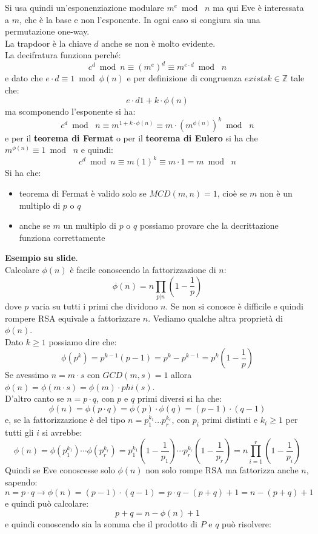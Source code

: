 \documentclass[a4paper,12pt, oneside]{book}
\begin{document}
Si usa quindi un'esponenziazione modulare $m^e\bmod\,\,n$ ma qui Eve è
interessata a $m$, che è la base e non l'esponente. In ogni caso si congiura sia
una permutazione one-way.\\
La trapdoor è la chiave $d$ anche se non è molto evidente.\\
La decifratura funziona perché:
\[c^d\bmod n\equiv (m^e)^d\equiv m^{e\cdot d}\bmod\,\,n\]
e dato che $e\cdot d\equiv 1\bmod\phi(n)$ e per definizione di congruenza
$exists k\in\mathbb{Z}$ tale che:
\[e\cdot d1+k\cdot\phi(n)\]
ma scomponendo l'esponente si ha:
\[c^d\bmod\,\,n\equiv m^{1+k\cdot\phi(n)}\equiv m\cdot (m^{\phi(n)})^k\bmod \,\,n\]
e per il \textbf{teorema di Fermat} o per il \textbf{teorema di Eulero} si ha
che $m^{\phi(n)}\equiv 1\bmod \,\,n$ e quindi:
\[c^d\bmod n\equiv m(1)^k\equiv m\cdot 1 = m\bmod \,\,n\]
Si ha che:
\begin{itemize}
  \item teorema di Fermat è valido solo se $MCD (m, n) = 1$, cioè se $m$ non è
  un   multiplo di $p$ o $q$ 
  \item anche se $m$ un multiplo di $p$ o $q$  possiamo provare
  che la decrittazione funziona correttamente 
\end{itemize}
\textbf{Esempio su slide}.\\
Calcolare $\phi(n)$ è facile conoscendo la fattorizzazione di $n$:
\[\phi(n)=n\prod_{p|n}\left(1-\frac{1}{p}\right)\]
dove $p$ varia su tutti i primi che dividono $n$. Se non si conosce è difficile
e quindi rompere RSA equivale a  fattorizzare $n$.
Vediamo qualche altra proprietà di $\phi(n)$. \\
Dato $k\geq 1$ possiamo dire che:
\[\phi(p^k)=p^{k-1}(p-1)=p^k-p^{k-1}=p^k\left(1-\frac{1}{p}\right)\]
Se avessimo $n=m\cdot s$ con $GCD(m,s)=1$ allora $\phi(n)=\phi(m\cdot
s)=\phi(m)\cdot phi(s)$.\\
D'altro canto se $n=p\cdot q$, con $p$ e $q$ primi diversi si ha che:
\[\phi(n)=\phi(p\cdot q)=\phi(p)\cdot \phi(q)=(p-1)\cdot (q-1)\]
e, se la fattorizzazione è del tipo $n=p_1^{k_1}\ldots p_r^{k_r}$, con $p_i$
primi distinti e $k_i\geq 1$ per tutti gli $i$ si avrebbe:
\[\phi(n)=\phi(p_1^{k_1})\cdots
  \phi(p_r^{k_r})=p_1^{k_1}\left(1-\frac{1}{p_1}\right)\cdots
  p_r^{k_r}\left(1-\frac{1}{p_r}\right)=n\prod_{i=1}^r
  \left(1-\frac{1}{p_i}\right)\]
Quindi se Eve conoscesse solo $\phi(n)$ non solo rompe RSA ma fattorizza anche
$n$, sapendo:
\[n=p\cdot q\to \phi(n)=(p-1)\cdot(q-1)=p\cdot q-(p+q)+1=n-(p+q)+1\]
e quindi può calcolare:
\[p+q=n-\phi(n)+1\]
e quindi conoscendo sia la somma che il prodotto di $P$ e $q$ può risolvere:
\end{document}
